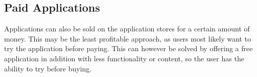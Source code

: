 \subsection{Paid Applications}
Applications can also be sold on the application stores for a certain amount of money. This may be the least profitable approach, as users most likely want to try the application before paying. This can however be solved by offering a free application in addition with less functionality or content, so the user has the ability to try before buying.